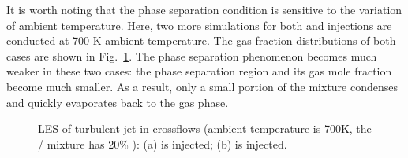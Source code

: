 It is worth noting that the phase separation condition is sensitive to the variation of ambient temperature. Here, two more simulations for both  and  injections are conducted at 700 K ambient temperature. The gas fraction distributions of both cases are shown in Fig.~\ref{JICF700}. The phase separation phenomenon becomes much weaker in these two cases: the phase separation region and its gas mole fraction become much smaller. As a result, only a small portion of the mixture condenses and quickly evaporates back to the gas phase.

\begin{figure}[htb]
    \centering
    \caption{LES of turbulent jet-in-crossflows (ambient temperature is 700K, the / mixture has 20\% ): (a)  is injected; (b)  is injected.}
    \label{JICF700}
\end{figure}

